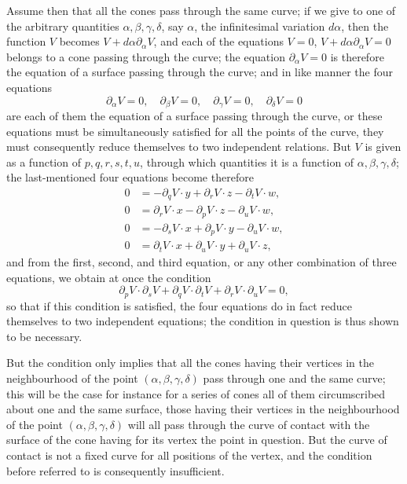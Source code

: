 \documentclass[11pt,a4paper]{book}
\begin{document}
Assume then that all the cones pass through the same curve; if we give to one of the arbitrary quantities $\alpha, \beta, \gamma, \delta$, say $\alpha$, the infinitesimal variation $d\alpha$, then the function $V$ becomes $V + d\alpha \partial_\alpha V$, and each of the equations $V = 0$, $V + d\alpha \partial_\alpha V = 0$ belongs to a cone passing through the curve; the equation $\partial_\alpha V = 0$ is therefore the equation of a surface passing through the curve; and in like manner the four equations
\[
\partial_\alpha V = 0,\quad \partial_\beta V = 0,\quad \partial_\gamma V = 0,\quad \partial_\delta V = 0
\]
are each of them the equation of a surface passing through the curve, or these equations must be simultaneously satisfied for all the points of the curve, they must consequently reduce themselves to two independent relations. But $V$ is given as a function of $p, q, r, s, t, u$, through which quantities it is a function of $\alpha, \beta, \gamma, \delta$; the last-mentioned four equations become therefore
\begin{align*}
0 &= -\partial_q V \cdot y + \partial_r V \cdot z - \partial_t V \cdot w,\\
0 &= \partial_r V \cdot x - \partial_p V \cdot z - \partial_u V \cdot w,\\
0 &= -\partial_s V \cdot x + \partial_p V \cdot y - \partial_u V \cdot w,\\
0 &= \partial_t V \cdot x + \partial_u V \cdot y + \partial_u V \cdot z,
\end{align*}
and from the first, second, and third equation, or any other combination of three equations, we obtain at once the condition
\[
\partial_p V \cdot \partial_s V + \partial_q V \cdot \partial_t V + \partial_r V \cdot \partial_u V = 0,
\]
so that if this condition is satisfied, the four equations do in fact reduce themselves to two independent equations; the condition in question is thus shown to be necessary.

But the condition only implies that all the cones having their vertices in the neighbourhood of the point $(\alpha, \beta, \gamma, \delta)$ pass through one and the same curve; this will be the case for instance for a series of cones all of them circumscribed about one and the same surface, those having their vertices in the neighbourhood of the point $(\alpha, \beta, \gamma, \delta)$ will all pass through the curve of contact with the surface of the cone having for its vertex the point in question. But the curve of contact is not a fixed curve for all positions of the vertex, and the condition before referred to is consequently insufficient.
\end{document}
